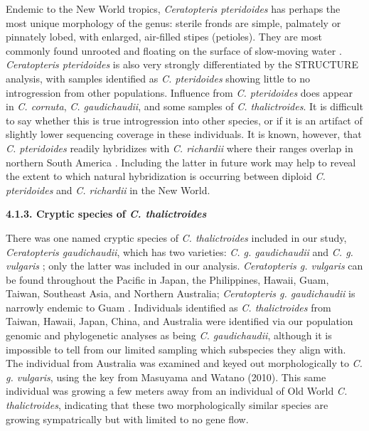 \documentclass[12pt]{article}
\begin{document}
\begin{flushleft}
Endemic to the New World tropics, \textit{Ceratopteris pteridoides} has perhaps the most unique morphology of the genus: sterile fronds are simple, palmately or pinnately lobed, with enlarged, air-filled stipes (petioles). They are most commonly found unrooted and floating on the surface of slow-moving water \autocite{LloydTax1974}. \textit{Ceratopteris pteridoides} is also very strongly differentiated by the {\small{STRUCTURE}} analysis, with samples identified as \textit{C. pteridoides} showing little to no introgression from other populations. Influence from \textit{C. pteridoides} does appear in \textit{C. cornuta}, \textit{C. gaudichaudii}, and some samples of \textit{C. thalictroides}. It is difficult to say whether this is true introgression into other species, or if it is an artifact of slightly lower sequencing coverage in these individuals. It is known, however, that \textit{C. pteridoides} readily hybridizes with \textit{C. richardii} where their ranges overlap in northern South America \autocite{hickok1974}. Including the latter in future work may help to reveal the extent to which natural hybridization is occurring between diploid \textit{C. pteridoides} and \textit{C. richardii} in the New World. 

\textbf{4.1.3. Cryptic species of \textit{C. thalictroides}}

There was one named cryptic species of \textit{C. thalictroides} included in our study, \textit{Ceratopteris gaudichaudii}, which has two varieties: \textit{C. g. gaudichaudii} and \textit{C. g. vulgaris} \autocite{Masuyama2010}; only the latter was included in our analysis. \textit{Ceratopteris g. vulgaris} can be found throughout the Pacific in Japan, the Philippines, Hawaii, Guam, Taiwan, Southeast Asia, and Northern Australia; \textit{Ceratopteris g. gaudichaudii} is narrowly endemic to Guam \autocite{Masuyama2010}. Individuals identified as \textit{C. thalictroides} from Taiwan, Hawaii, Japan, China, and Australia were identified via our population genomic and phylogenetic analyses as being \textit{C. gaudichaudii}, although it is impossible to tell from our limited sampling which subspecies they align with. The individual from Australia was examined and keyed out morphologically to \textit{C. g. vulgaris}, using the key from Masuyama and Watano (2010). This same individual was growing a few meters away from an individual of Old World \textit{C. thalictroides}, indicating that these two morphologically similar species are growing sympatrically but with limited to no gene flow. 


\end{flushleft}
\end{document}
